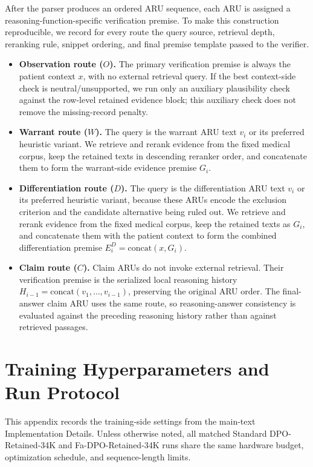 \documentclass[a4paper,fleqn,doubleblind]{cas-sc}
\begin{document}
After the parser produces an ordered ARU sequence, each ARU is assigned a reasoning-function-specific verification premise. To make this construction reproducible, we record for every route the query source, retrieval depth, reranking rule, snippet ordering, and final premise template passed to the verifier.

\begin{itemize}[leftmargin=*]
    \item \textbf{Observation route ($O$).} The primary verification premise is always the patient context $x$, with no external retrieval query. If the best context-side check is neutral/unsupported, we run only an auxiliary plausibility check against the row-level retained evidence block; this auxiliary check does not remove the missing-record penalty.
    \item \textbf{Warrant route ($W$).} The query is the warrant ARU text $v_i$ or its preferred heuristic variant. We retrieve and rerank evidence from the fixed medical corpus, keep the retained texts in descending reranker order, and concatenate them to form the warrant-side evidence premise $G_i$.
    \item \textbf{Differentiation route ($D$).} The query is the differentiation ARU text $v_i$ or its preferred heuristic variant, because these ARUs encode the exclusion criterion and the candidate alternative being ruled out. We retrieve and rerank evidence from the fixed medical corpus, keep the retained texts as $G_i$, and concatenate them with the patient context to form the combined differentiation premise $E_i^{D} = \mathrm{concat}(x, G_i)$.
    \item \textbf{Claim route ($C$).} Claim ARUs do not invoke external retrieval. Their verification premise is the serialized local reasoning history $H_{i-1} = \mathrm{concat}(v_1, \dots, v_{i-1})$, preserving the original ARU order. The final-answer claim ARU uses the same route, so reasoning-answer consistency is evaluated against the preceding reasoning history rather than against retrieved passages.
\end{itemize}

\section{Training Hyperparameters and Run Protocol}
\label{app:training_details}

This appendix records the training-side settings from the main-text Implementation Details. Unless otherwise noted, all matched Standard DPO-Retained-34K and Fa-DPO-Retained-34K runs share the same hardware budget, optimization schedule, and sequence-length limits.
\end{document}
